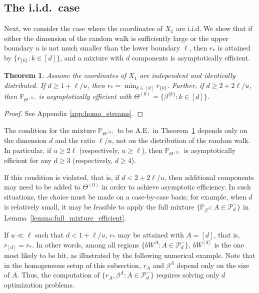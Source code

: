 \documentclass[aap,preprint]{imsart}
\newcommand{\Pro}{{\mathbb{P}}}
\theoremstyle{plain}
\newtheorem{theorem}{Theorem}[section]
\theoremstyle{definition}
\begin{document}
\subsection{The i.i.d.~case} \label{subsec:iid_case_Siegmund}
Next, we consider the case where the coordinates of $X_1$ are i.i.d. We show that if either the dimension of the random walk is sufficiently large or the upper boundary $u$ is not much smaller than the lower boundary $\ell$, then $r_{*}$ is attained by $\{r_{\{k\}}: k \in [d]\}$, and a mixture with $d$ components is asymptotically efficient.



\begin{theorem}\label{thm:homo_case}
Assume the coordinates of $X_1$ are independent and identically distributed. If $d \geq 1+\ell/u$, then $r_* = \min_{k \in [d]} r_{\{k\}}$. Further, if $d \geq 2+2\ell/u$, then $\Pro_{\Theta^{(0)}}$ is asymptotically efficient with $\Theta^{(0)} = \{\beta^{\{k\}}: k \in [d]\}$.
\end{theorem}
\begin{proof}
See Appendix \ref{app:homo_streams}.
\end{proof}

The condition for the mixture $\Pro_{\Theta^{(0)}}$ to be A.E.~in Theorem~\ref{thm:homo_case} depends only on the dimension $d$ and the ratio $\ell/u$, not on the distribution of the random walk. In particular, if $u \geq 2\ell$ (respectively, $u \geq \ell$), then $\Pro_{\Theta^{(0)}}$ is asymptotically efficient for any $d \geq 3$ (respectively, $d \geq 4$).


If this condition is violated, that is, if $d < 2 + 2\ell/u$, then additional components may need to be added to $\Theta^{(0)}$ in order to achieve asymptotic efficiency. In such situations, the choice must be made on a case-by-case basis; for example, when $d$ is relatively small, it may be feasible to apply the full mixture $\{\Pro_{\beta^A} : A \in \mathcal{P}_{d}^-\}$ in Lemma~\ref{lemma:full_mixture_efficient}.



If $u \ll \ell$ such that $d < 1+\ell/u$, $r_*$ may be attained with $A = [d]$, that is, $r_{[d]} = r_*$. In other words, among all regions $\{bW^{A}: A\in \mathcal{P}_{d}^{-}\}$, $bW^{[d]}$ is the one most likely to be hit, as illustrated by the following numerical example. Note that in the homogeneous setup of this subsection, $r_A$ and $\beta^A$ depend only on the size of $A$. Thus, the computation of $\{r_A, \beta^A : A \in \mathcal{P}_{d}^-\}$ requires solving only $d$ optimization problems.
\end{document}
